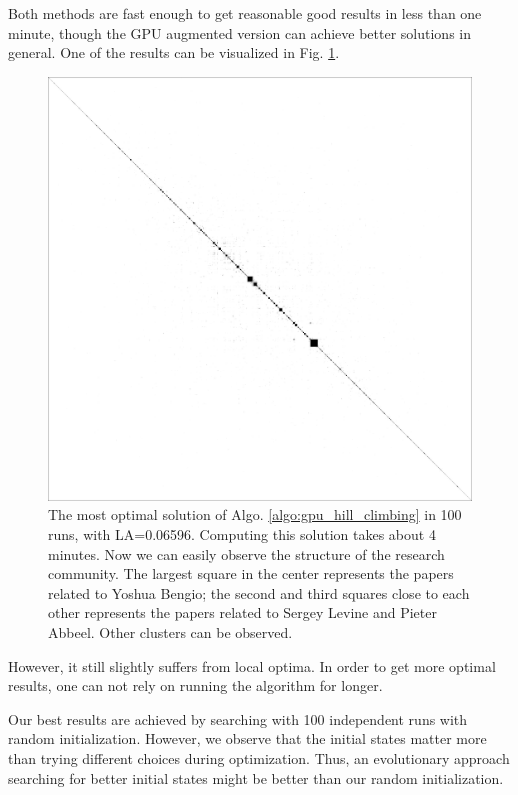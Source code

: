 Both methods are fast enough to get reasonable good results in less than one minute, though the GPU augmented version can achieve better solutions in general.
One of the results can be visualized in Fig. \ref{fig:optimization_results}.

\begin{figure}
    \centering
    \includegraphics[width=\textwidth]{images/seed_94_step_0181.png}
    \caption{The most optimal solution of Algo. \ref{algo:gpu_hill_climbing} in 100 runs, with LA=0.06596.
    Computing this solution takes about 4 minutes.
    Now we can easily observe the structure of the research community.
    The largest square in the center represents the papers related to Yoshua Bengio;
    the second and third squares close to each other represents the papers related to Sergey Levine and Pieter Abbeel.
    Other clusters can be observed.
    }
    \label{fig:optimization_results}
\end{figure}

However, it still slightly suffers from local optima.
In order to get more optimal results, one can not rely on running the algorithm for longer.

Our best results are achieved by searching with 100 independent runs with random initialization.
However, we observe that the initial states matter more than trying different choices during optimization.
Thus, an evolutionary approach \cite{eppley2001} searching for better initial states might be better than our random initialization.
